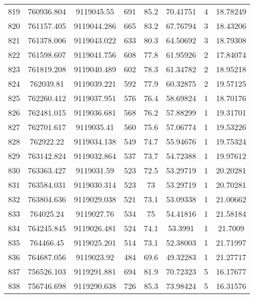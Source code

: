 \begin{longtable}{cccccccc}
819  & 760936.804      & 9119045.55       & 691     & 85.2  & 70.41751 & 4  & 18.78249 \\
820  & 761157.405      & 9119044.286      & 665     & 83.2  & 67.76794 & 3  & 18.43206 \\
821  & 761378.006      & 9119043.022      & 633     & 80.3  & 64.50692 & 3  & 18.79308 \\
822  & 761598.607      & 9119041.756      & 608     & 77.8  & 61.95926 & 2  & 17.84074 \\
823  & 761819.208      & 9119040.489      & 602     & 78.3  & 61.34782 & 2  & 18.95218 \\
824  & 762039.81       & 9119039.221      & 592     & 77.9  & 60.32875 & 2  & 19.57125 \\
825  & 762260.412      & 9119037.951      & 576     & 76.4  & 58.69824 & 1  & 18.70176 \\
826  & 762481.015      & 9119036.681      & 568     & 76.2  & 57.88299 & 1  & 19.31701 \\
827  & 762701.617      & 9119035.41       & 560     & 75.6  & 57.06774 & 1  & 19.53226 \\
828  & 762922.22       & 9119034.138      & 549     & 74.7  & 55.94676 & 1  & 19.75324 \\
829  & 763142.824      & 9119032.864      & 537     & 73.7  & 54.72388 & 1  & 19.97612 \\
830  & 763363.427      & 9119031.59       & 523     & 72.5  & 53.29719 & 1  & 20.20281 \\
831  & 763584.031      & 9119030.314      & 523     & 73    & 53.29719 & 1  & 20.70281 \\
832  & 763804.636      & 9119029.038      & 521     & 73.1  & 53.09338 & 1  & 21.00662 \\
833  & 764025.24       & 9119027.76       & 534     & 75    & 54.41816 & 1  & 21.58184 \\
834  & 764245.845      & 9119026.481      & 524     & 74.1  & 53.3991  & 1  & 21.7009  \\
835  & 764466.45       & 9119025.201      & 514     & 73.1  & 52.38003 & 1  & 21.71997 \\
836  & 764687.056      & 9119023.92       & 484     & 69.6  & 49.32283 & 1  & 21.27717 \\
837  & 756526.103      & 9119291.881      & 694     & 81.9  & 70.72323 & 5  & 16.17677 \\
838  & 756746.698      & 9119290.638      & 726     & 85.3  & 73.98424 & 5  & 16.31576 \\

\end{longtable}
